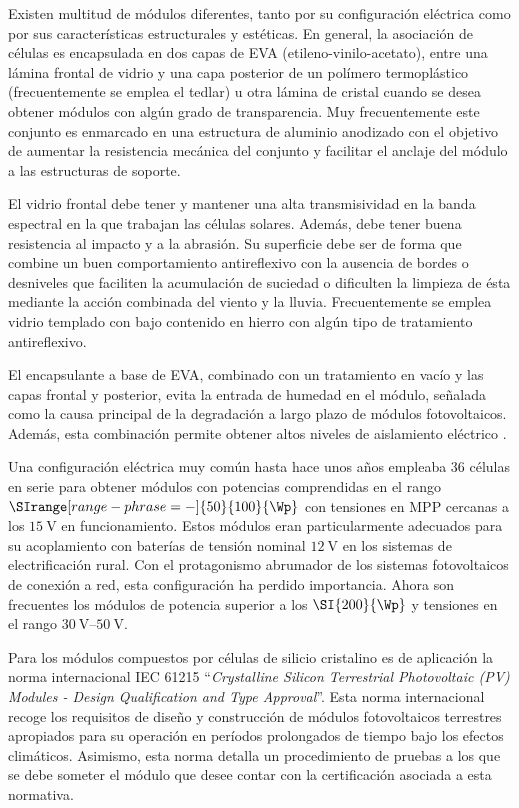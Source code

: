Existen multitud de módulos diferentes, tanto por su configuración
eléctrica como por sus características estructurales y estéticas.
En general, la asociación de células es encapsulada en dos capas de
EVA (etileno-vinilo-acetato), entre una lámina frontal de vidrio y
una capa posterior de un polímero termoplástico (frecuentemente se
emplea el tedlar) u otra lámina de cristal cuando se desea obtener
módulos con algún grado de transparencia. Muy frecuentemente este
conjunto es enmarcado en una estructura de aluminio anodizado con
el objetivo de aumentar la resistencia mecánica del conjunto y facilitar
el anclaje del módulo a las estructuras de soporte.

El vidrio frontal debe tener y mantener una alta transmisividad en
la banda espectral en la que trabajan las células solares. Además,
debe tener buena resistencia al impacto y a la abrasión. Su superficie
debe ser de forma que combine un buen comportamiento antireflexivo
con la ausencia de bordes o desniveles que faciliten la acumulación
de suciedad o dificulten la limpieza de ésta mediante la acción combinada
del viento y la lluvia. Frecuentemente se emplea vidrio templado con
bajo contenido en hierro con algún tipo de tratamiento antireflexivo.

El encapsulante a base de EVA, combinado con un tratamiento en vacío
y las capas frontal y posterior, evita la entrada de humedad en el
módulo, señalada como la causa principal de la degradación a largo
plazo de módulos fotovoltaicos. Además, esta combinación permite obtener
altos niveles de aislamiento eléctrico \cite{Wenham.Green.ea2000}. 

Una configuración eléctrica muy común hasta hace unos años empleaba
36 células en serie para obtener módulos con potencias comprendidas
en el rango $\SIrange[range-phrase=-]{50}{100}{\Wp}$ con tensiones
en MPP cercanas a los $\SI{15}{\volt}$ en funcionamiento. Estos módulos
eran particularmente adecuados para su acoplamiento con baterías de
tensión nominal $\SI{12}{\volt}$ en los sistemas de electrificación
rural. Con el protagonismo abrumador de los sistemas fotovoltaicos
de conexión a red, esta configuración ha perdido importancia. Ahora
son frecuentes los módulos de potencia superior a los $\SI{200}{\Wp}$
y tensiones en el rango $\SIrange[range-phrase=-]{30}{50}{\volt}$.

Para los módulos compuestos por células de silicio cristalino es de
aplicación la norma internacional IEC 61215 {}``\emph{Crystalline
Silicon Terrestrial Photovoltaic (PV) Modules - Design Qualification
and Type Approval}''. Esta norma internacional recoge los requisitos
de diseño y construcción de módulos fotovoltaicos terrestres apropiados
para su operación en períodos prolongados de tiempo bajo los efectos
climáticos. Asimismo, esta norma detalla un procedimiento de pruebas
a los que se debe someter el módulo que desee contar con la certificación
asociada a esta normativa.


